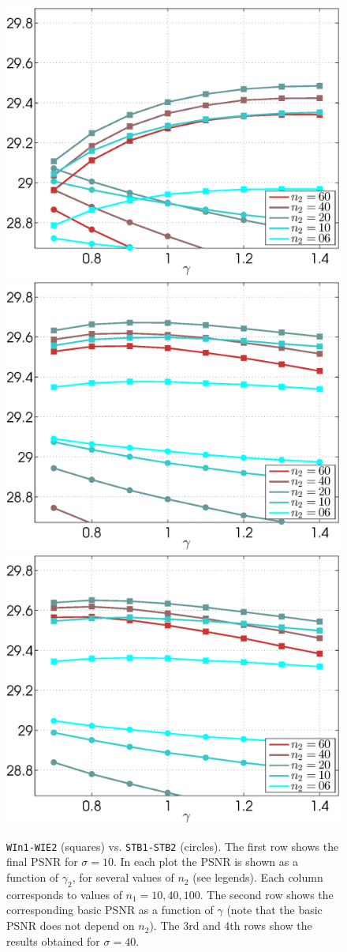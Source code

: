 \documentclass{ipol}
\begin{document}
\begin{figure}[ht!]
	\includegraphics[width=.33\textwidth]{f/nldct/STB1STB2-vs-WIn1WIE2_fpsnr_np2-g-curves_1np010_s40_average.eps}%
	\includegraphics[width=.33\textwidth]{f/nldct/STB1STB2-vs-WIn1WIE2_fpsnr_np2-g-curves_1np040_s40_average.eps}%
	\includegraphics[width=.33\textwidth]{f/nldct/STB1STB2-vs-WIn1WIE2_fpsnr_np2-g-curves_1np100_s40_average.eps}\\
	\caption{\texttt{WIn1-WIE2} (squares) vs. \texttt{STB1-STB2} (circles). The first
	row shows the final PSNR for $\sigma = 10$. In each plot the PSNR is shown
	as a function of $\gamma_2$, for several values of $n_2$ (see legends). Each
	column corresponds to values of $n_1 = 10, 40, 100$. The second row shows the
	corresponding basic PSNR as a function of $\gamma$ (note that the basic PSNR does
	not depend on $n_2$). The 3rd and 4th rows show the results obtained for $\sigma = 40$.}
	\label{fig:STB1STB2-vs-WIn1WIE2}
\end{figure}
\end{document}
